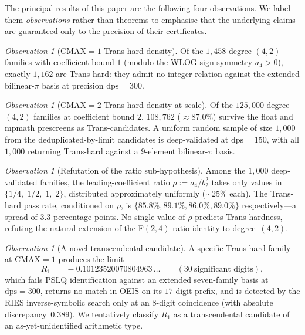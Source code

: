 \documentclass[11pt,a4paper]{amsart}
\theoremstyle{definition}
\theoremstyle{remark}
\newtheorem{observation}[theorem]{Observation}
\newcommand{\dps}{\mathrm{dps}}
\begin{document}
The principal results of this paper are the following four
observations.  We label them \emph{observations} rather than theorems
to emphasise that the underlying claims are guaranteed only to the
precision of their certificates.

\begin{observation}[CMAX$=1$ Trans-hard density]
\label{obs:cmax1}
Of the $1{,}458$ degree-$(4,2)$ families with coefficient bound $1$
(modulo the WLOG sign symmetry $a_4 > 0$), exactly $1{,}162$ are
Trans-hard: they admit no integer relation against the extended
bilinear-$\pi$ basis at precision $\dps=300$.
\end{observation}

\begin{observation}[CMAX$=2$ Trans-hard density at scale]
\label{obs:cmax2}
Of the $125{,}000$ degree-$(4,2)$ families at coefficient bound $2$,
$108{,}762$ ($\approx 87.0\%$) survive the float and mpmath
prescreens as Trans-candidates.  A uniform random sample of size
$1{,}000$ from the deduplicated-by-limit candidates is deep-validated
at $\dps=150$, with all $1{,}000$ returning Trans-hard against a
$9$-element bilinear-$\pi$ basis.
\end{observation}

\begin{observation}[Refutation of the ratio sub-hypothesis]
\label{obs:ratio-refuted}
Among the $1{,}000$ deep-validated families, the leading-coefficient
ratio $\rho := a_4/b_2^2$ takes only values in
$\{1/4,\;1/2,\;1,\;2\}$, distributed approximately uniformly
($\sim25\%$ each).  The Trans-hard pass rate, conditioned on $\rho$,
is $\{85.8\%, 89.1\%, 86.0\%, 89.0\%\}$ respectively---a spread of
$3.3$ percentage points.  No single value of $\rho$ predicts
Trans-hardness, refuting the natural extension of the F$(2,4)$
ratio identity to degree~$(4,2)$.
\end{observation}

\begin{observation}[A novel transcendental candidate]
\label{obs:R1}
A specific Trans-hard family at $\mathrm{CMAX}=1$ produces the limit
\[
  R_1 \;=\; -0.10123520070804963\,\ldots
  \qquad (30\ \text{significant digits}),
\]
which fails PSLQ identification against an extended seven-family basis
at $\dps=300$, returns no match in OEIS on its $17$-digit prefix, and
is detected by the RIES inverse-symbolic search only at an $8$-digit
coincidence (with absolute discrepancy~$0.389$).  We tentatively
classify $R_1$ as a transcendental candidate of an as-yet-unidentified
arithmetic type.
\end{observation}
\end{document}

